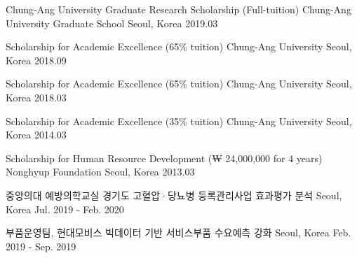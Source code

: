 \documentclass[11pt, a4paper]{awesome-cv} %
\begin{document}
\begin{cvhonors}
	\cvhonor
	{Chung-Ang University Graduate Research Scholarship (Full-tuition)} %
	{Chung-Ang University Graduate School} %
	{Seoul, Korea} %
	{2019.03} %
	
	\cvhonor
	{Scholarship for Academic Excellence (65\% tuition)} %
	{Chung-Ang University} %
	{Seoul, Korea} %
	{2018.09} %
	
	\cvhonor
	{Scholarship for Academic Excellence (65\% tuition)} %
	{Chung-Ang University} %
	{Seoul, Korea} %
	{2018.03} %
	
	\cvhonor
	{Scholarship for Academic Excellence (35\% tuition)} %
	{Chung-Ang University} %
	{Seoul, Korea} %
	{2014.03} %
	
	\cvhonor
	{Scholarship for Human Resource Development (₩ 24,000,000 for 4 years)} %
	{Nonghyup Foundation} %
	{Seoul, Korea} %
	{2013.03} %
\end{cvhonors}



\begin{cventries}
	\cventry
	{중앙의대 예방의학교실} %
	{경기도 고혈압·당뇨병 등록관리사업 효과평가 분석} %
	{Seoul, Korea} %
	{Jul. 2019 - Feb. 2020} %
	{ %
	}
	
	\cventry
	{부품운영팀, 현대모비스} %
	{빅데이터 기반 서비스부품 수요예측 강화} %
	{Seoul, Korea} %
	{Feb. 2019 - Sep. 2019} %
	{ %
	}
\end{cventries}
\end{document}
